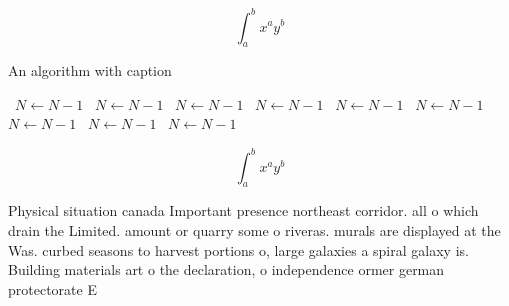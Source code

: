 \documentclass[a4paper]{article}
\begin{document}
\[ \int_{a}^{b}{x^{a}y^{b}} \]

\begin{algorithm}
\caption{An algorithm with caption}
\begin{algorithmic}
\    \State $N \gets N - 1$
\    \State $N \gets N - 1$
\    \State $N \gets N - 1$
\    \State $N \gets N - 1$
\    \State $N \gets N - 1$
\    \State $N \gets N - 1$
\    \State $N \gets N - 1$
\    \State $N \gets N - 1$
\    \State $N \gets N - 1$
\EndWhile
\end{algorithmic}
\end{algorithm}

\[ \int_{a}^{b}{x^{a}y^{b}} \]

Physical situation canada Important presence northeast corridor. all o which drain the Limited. amount or quarry some o riveras. murals are displayed at the Was. curbed seasons to harvest portions o, large galaxies a spiral galaxy is. Building materials art o the declaration, o independence ormer german protectorate E
\end{document}

